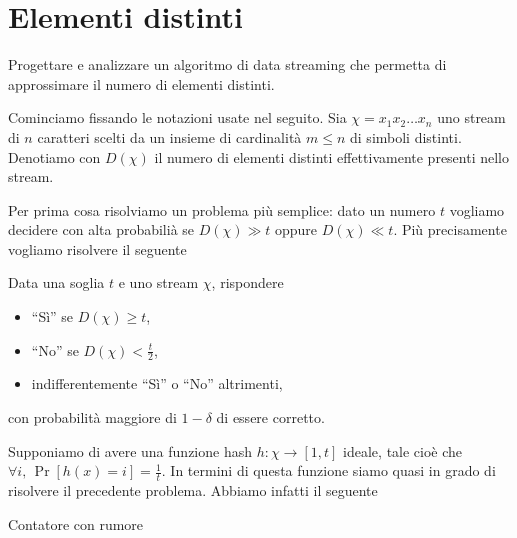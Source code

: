 \chapter{Elementi distinti}

\begin{problem*}
    Progettare e analizzare un algoritmo di data streaming che permetta di
    approssimare il numero di elementi distinti.
\end{problem*}

Cominciamo fissando le notazioni usate nel seguito. Sia \(\chi = x_1 x_2
\dots x_n\) uno stream di \(n\) caratteri scelti da un insieme di cardinalit\`a
\(m\le n\) di simboli distinti. Denotiamo con \(D(\chi)\) il numero di elementi
distinti effettivamente presenti nello stream.

Per prima cosa risolviamo un problema pi\`u semplice: dato un numero \(t\)
vogliamo decidere con alta probabili\`a se \(D(\chi) \gg t\) oppure \(D(\chi) \ll
t\). Pi\`u precisamente vogliamo risolvere il seguente
\begin{problem*}[Semplificato]
  Data una soglia \(t\) e uno stream \(\chi\), rispondere
  \begin{itemize}
    \item ``S\`i'' se \(D(\chi)\ge t\),
    \item ``No'' se \(D(\chi)<\frac{t}{2}\),
    \item indifferentemente ``S\`i'' o ``No'' altrimenti,
  \end{itemize}
  con probabilit\`a maggiore di \(1 - \delta\) di essere corretto.
\end{problem*}

Supponiamo di avere una funzione hash \(h:\chi\rightarrow [1,t]\) ideale, tale
cio\`e che \(\forall i\mbox{, }\Pr[h(x)=i]=\frac{1}{t}\). In termini di
questa funzione siamo quasi in grado di risolvere il precedente problema.
Abbiamo infatti il seguente
\begin{algorithm}
  \caption{Contatore con rumore}
  \begin{algorithmic}[1]
        \State {}
      \EndIf
    \EndFor
    \State {}
    \EndFunction
  \end{algorithmic}
\end{algorithm}

